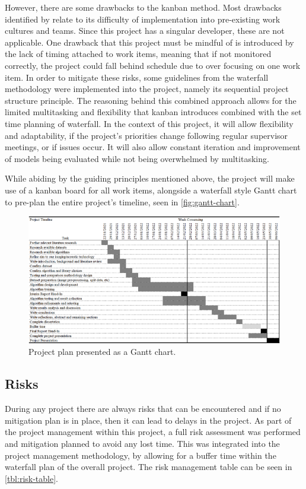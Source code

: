 However, there are some drawbacks to the kanban method. Most drawbacks identified by \cite{ahmad2013kanban} relate to its difficulty of implementation into pre-existing work cultures and teams. Since this project has a singular developer, these are not applicable. One drawback that this project must be mindful of is introduced by the lack of timing attached to work items, meaning that if not monitored correctly, the project could fall behind schedule due to over focusing on one work item. In order to mitigate these risks, some guidelines from the waterfall methodology were implemented into the project, namely its sequential project structure principle. The reasoning behind this combined approach allows for the limited multitasking and flexibility that kanban introduces combined with the set time planning of waterfall. In the context of this project, it will allow flexibility and adaptability, if the project's priorities change following regular supervisor meetings, or if issues occur. It will also allow constant iteration and improvement of models being evaluated while not being overwhelmed by multitasking.

While abiding by the guiding principles mentioned above, the project will make use of a kanban board for all work items, alongside a waterfall style Gantt chart to pre-plan the entire project's timeline, seen in \autoref{fig:gantt-chart}.

\begin{figure}[H]
    \centering
    \includegraphics[width=\textwidth]{figures/gantt-chart.png}
    \caption{Project plan presented as a Gantt chart.}
    \label{fig:gantt-chart}
\end{figure}

\subsection{Risks} \label{risks}
During any project there are always risks that can be encountered and if no mitigation plan is in place, then it can lead to delays in the project. As part of the project management within this project, a full risk assessment was performed and mitigation planned to avoid any lost time. This was integrated into the project management methodology, by allowing for a buffer time within the waterfall plan of the overall project. The risk management table can be seen in \autoref{tbl:risk-table}.

